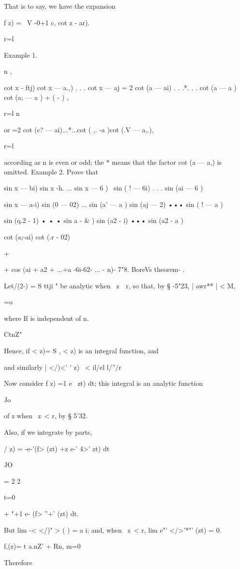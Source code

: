 {That is to say, we have the expansion

f z) = \ V -0+1 c, cot z - ar).

  r=l

Example 1.

n ,

cot x - ftj) cot x — a.,) . . . cot x — aj = 2 cot (a — ai) . . .*. .
. cot (a — a ) cot (a; — a ) + ( - ) ,

r=l n

or =2 cot (c? — ai)...*...cot ( ,. -a )cot (.V — a,.),

r=l

according as n is even or odd; the * means that the factor cot (a —
a,) is omitted. Example 2. Prove that

sin x — bi) sin x -h. ... sin x — 6 ) \ sin ( ! — 6i) . . . sin (ai —
6 )

sin x — a-i) sin (0 — 02) ... sin (a' — a ) sin (aj — 2) ••• sin ( ! —
a )

sin (q.2 - 1) • • • sin a - \& ) sin (a2 - i) ••• sin (a2 - a )

cot (a;-ai) cot (.r - 02)

+

+ cos (ai + a2 + ...+a -6i-62- ... - n)- 7"8. BoreVs theorem- .

Let/(2-) = S ttji " be analytic when \ z\ \ r, so that, by § -5"23, |
awr** | < M,

 =o

where If is independent of n.

CtnZ"

Hence, if < z)= S , < z) is an integral function, and

and similarly | </)<' ' z) \ < il/el l/''/r

Now consider f z) =1 e~ zt) dt; this integral is an analytic function

Jo

of z when \ z\ < r, by § 5'32.

Also, if we integrate by parts,

/ z) = -e-'(f> (zt) +z e-' 4>' zt) dt

JO

= 2 2

 t=0

+ "+1 e- (f> ''+' (zt) dt.

But lim -< </)" > ( ) = a i; and, when \ z\ < r, lim e"' </>'*"' (zt)
= 0.

f,(z)= t a.nZ' + Rn, m=0

Therefore

}
